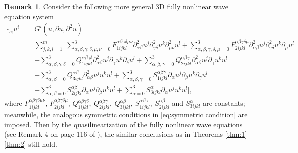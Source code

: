 \documentclass[11pt,twoside]{article}
\theoremstyle{plain}
\theoremstyle{definition}
\newtheorem{remark}{Remark}[section]
\numberwithin{equation}{section}
\begin{document}
\begin{remark}
	Consider the following more general 3D fully nonlinear wave equation system
	\[
	\begin{aligned}
	\square_{c_i} u^i =& G^i(u,\partial u, \partial^2 u) \\
	=&\sum_{j,k,l=1}^m\big[\sum_{\alpha,\beta,\gamma,\delta,\mu,\nu=0}^3 F_{1ijkl}^{\alpha\beta\gamma\delta\mu\nu} \partial_{\alpha\beta}^2 u^j \partial_{\gamma\delta}^2 u^k\partial_{\mu\nu}^2 u^l+
	 \sum_{\alpha,\beta,\gamma,\delta,\mu=0}^3 F_{2ijkl}^{\alpha\beta\gamma\delta\mu} \partial_{\alpha\beta}^2 u^j\partial_{\gamma\delta}^2 u^k \partial_\mu u^l\\
	&+\sum_{\alpha,\beta,\gamma,\delta=0}^3 Q^{\alpha\beta\gamma\delta}_{1ijkl} \partial_{\alpha\beta}^2 u^j\partial_\gamma u^k\partial_\delta u^l
	+\sum_{\alpha,\beta,\gamma=0}^3 Q^{\alpha\beta\gamma}_{2ijkl} \partial_{\alpha\beta}^2 u^j\partial_\gamma u^ku^l\\
	&+\sum_{\alpha,\beta=0}^3 Q^{\alpha\beta}_{3ijkl} \partial_{\alpha\beta}^2 u^j u^k  u^l
	+\sum_{\alpha,\beta,\gamma=0}^3 S^{\alpha\beta\gamma}_{1ijkl} \partial_{\alpha} u^j\partial_\beta u^k\partial_\gamma u^l\\
	&+\sum_{\alpha,\beta=0}^3 S^{\alpha\beta}_{2ijkl} \partial_{\alpha} u^j\partial_\beta u^k  u^l
	+\sum_{\alpha=0}^3 S^{\alpha}_{3ijkl} \partial_{\alpha} u^j  u^k u^l \big],
	\end{aligned}
	\]
where $F_{1ijkl}^{\alpha\beta\gamma\delta\mu\nu}$, $F_{2ijkl}^{\alpha\beta\gamma\delta\mu}$, $Q^{\alpha\beta\gamma\delta}_{1ijkl},\ Q^{\alpha\beta\gamma}_{2ijkl},\ Q^{\alpha\beta}_{3ijkl},\ S^{\alpha\beta\gamma}_{1ijkl},\ S^{\alpha\beta}_{2ijkl}$
and $S^{\alpha}_{3ijkl}$ are constants; meanwhile, the analogous symmetric conditions in \eqref{eq:symmetric condition} are imposed.
Then by the quasilinearization of the fully nonlinear wave equations (see Remark 4 on page 116
of \cite{Hormander}), the similar conclusions as in Theorems \ref{thm:1}--\ref{thm:2} still hold.
\end{remark}
\end{document}
